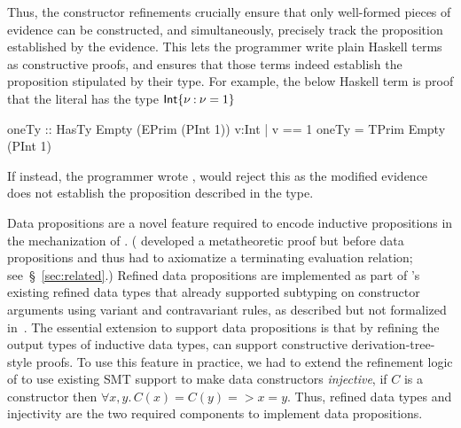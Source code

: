 \begin{fullversion}

%
Thus, the constructor refinements crucially ensure that only well-formed pieces of evidence
can be constructed, and simultaneously, precisely track the proposition established
by the evidence.
%
This lets the programmer write plain Haskell terms as constructive proofs, and \lh ensures
that those terms indeed establish the proposition stipulated by their type.
%
For example, the below Haskell term is proof that the literal  has the type
${{{\sf Int}}\{\nu \mathbin{:} \nu = 1\}}$
%
\begin{mcode}
  oneTy :: HasTy Empty (EPrim (PInt 1)) {v:Int | v == 1}
  oneTy = TPrim Empty (PInt 1)
\end{mcode}
%
If instead, the programmer wrote
, \lh would reject  
this
as the modified evidence does not establish
the proposition described in the type.
%
\end{fullversion}


Data propositions are a novel feature required to encode 
inductive propositions in
the mechanization of \sysrf. 
(\citet{lweb} developed a \lh metatheoretic proof  
but before data propositions and thus had to axiomatize a terminating 
evaluation relation; see~\S~\ref{sec:related}.)
%
Refined data propositions are implemented as part of \lh's existing 
refined data types that already supported subtyping on constructor arguments 
using variant and contravariant rules, as described but not formalized in~\cite{sprite}. 
The essential extension to support data propositions is that by refining the output types 
of inductive data types, \lh can support constructive derivation-tree-style proofs.
%
To use this feature in practice, we had to extend the refinement logic 
of \lh to use existing SMT support to make data constructors \emph{injective}, 
\ie if $C$ is a constructor then $\forall x, y.\, C(x) = C(y) => x = y$.
Thus, refined data types and injectivity are the two required 
components to implement data propositions.


